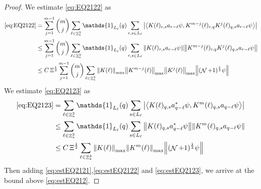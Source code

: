 \documentclass[sn-mathphys, Numbered ,a4paper]{sn-jnl}%
\DeclareMathOperator{\Z}{\mathbb{Z}}
\DeclareMathOperator{\NN}{\mathcal{N}}
\newcommand{\half}{\frac{1}{2}}
\newcommand{\eva}[1]{\left\langle #1 \right\rangle}
\theoremstyle{plain}
\theoremstyle{definition}
\theoremstyle{remark}
\theoremstyle{plain}
\theoremstyle{definition}
\theoremstyle{remark}
\begin{document}
\begin{proof}
We estimate \eqref{eq:EQ2122} as
\begin{align}
     \eqref{eq:EQ2122}
    &=\sum\limits_{j=1}^{m-1} {{m}\choose j} \sum\limits_{\ell \in \Z^3_*}\mathds{1}_{L_{\ell}}(q) \sum\limits_{r,s\in L_{\ell}}  \abs{\eva{ K(\ell)_{r,s} a_{r-\ell}\psi, K^{m-j}(\ell)_{r,q} K^{j}(\ell)_{q,s} a_{r-\ell} \psi }}\nonumber\\
    &\leq \sum\limits_{j=1}^{m-1} {{m}\choose j} \sum\limits_{\ell \in \Z^3_*}\mathds{1}_{L_{\ell}}(q) \sum\limits_{r,s\in L_{\ell}}  \norm{ K(\ell)_{r,s} a_{r-\ell}\psi}\norm{ K^{m-j}(\ell)_{r,q} K^{j}(\ell)_{q,s} a_{r-\ell} \psi } \nonumber\\
    &\leq C\,\Xi^\half \sum\limits_{j=1}^{m-1} {{m}\choose j}\sum\limits_{\ell \in \Z^3_*} \norm{K(\ell)}_{\mathrm{max}} \norm{K^{m-j}(\ell)}_{\mathrm{max}} \norm{K^j(\ell)}_{\mathrm{max}} \norm{(\NN+1)^\half \psi} \label{eq:estEQ2122}
    \end{align}
    We estimate \eqref{eq:EQ2123} as 
    \begin{align}
    	\eqref{eq:EQ2123}
    	&=\sum\limits_{\ell \in \Z^3_*} \mathds{1}_{L_{\ell}}(q) \sum\limits_{ s \in L_{\ell}} \abs{\eva{K(\ell)_{q,s} a^*_{q-\ell} \psi, K^m(\ell)_{q,s}  a_{q-\ell} \psi }} \nonumber\\
    	&\leq \sum\limits_{\ell \in \Z^3_*} \mathds{1}_{L_{\ell}}(q) \sum\limits_{ s \in L_{\ell}} \norm{K(\ell)_{q,s} a^*_{q-\ell} \psi}\norm{ K^m(\ell)_{q,s}  a_{q-\ell} \psi } \nonumber\\
    	&\leq C\,\Xi^\half \sum\limits_{\ell \in \Z^3_*} \norm{K(\ell)}_{\mathrm{max}} \norm{K^m(\ell)}_{\mathrm{max}}  \norm{  (\NN+1)^\half \psi}\label{eq:estEQ2123}
    \end{align} 
Then adding \eqref{eq:estEQ2121},\eqref{eq:estEQ2122} and \eqref{eq:estEQ2123}, we arrive at the bound above \eqref{eq:estEQ212}.
\end{proof}
\end{document}
